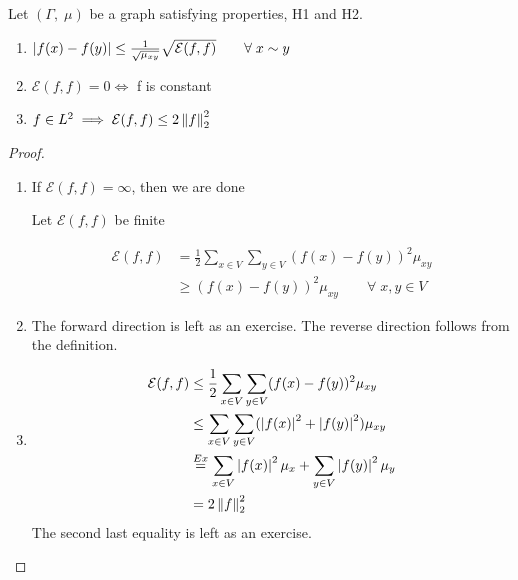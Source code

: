 \documentclass[main]{subfiles}
\begin{document}
\begin{prop}
    Let $(\Gamma,\;\mu)$ be a graph satisfying properties, H1 and H2.
    \begin{enumerate}
        \item
              $\left\lvert f(x)-f(y)\right\rvert\leq\frac{1}{\sqrt{\mu_{xy}}}\sqrt{\mathcal{E}(f,f)}\hspace{2em}\forall\;x\sim y$
        \item
              $\mathcal{E}(f, f) = 0 \iff $ f is constant
        \item
              $f \in L^2 \implies \mathcal{E}(f, f) \leq 2\left\lVert f\right\rVert_{2}^2$
    \end{enumerate}
    \begin{proof}
        \begin{enumerate}
            \item
                  If $\mathcal{E}(f,f) = \infty$, then we are done

                  Let $\mathcal{E}(f,f)$ be finite

                  \begin{align*}
                      \mathcal{E}(f,f) & = \frac{1}{2}\sum_{x \in V}\sum_{y \in V}(f(x)-f(y))^2\mu_{xy} \\
                                       & \geq (f(x)-f(y))^2\mu_{xy} \hspace{2em} \forall\;x,y \in V
                  \end{align*}
            \item The forward direction is left as an exercise. The reverse direction follows from the definition.
            \item \begin{align*}
                      \mathcal{E}(f,f) & \leq \frac{1}{2}\sum_{x \in V}\sum_{y \in V}(f(x)-f(y))^2\mu_{xy}                  \\
                                       & \leq \sum_{x \in V}\sum_{y \in V}(\left\lvert f(x)\right\rvert^2+\left\lvert f(y)\right\rvert^2)\mu_{xy}               \\
                                       & \stackrel{Ex}{=} \sum_{x \in V}\left\lvert f(x)\right\rvert^2\mu_x + \sum_{y \in V}\left\lvert f(y)\right\rvert^2\mu_y \\
                                       & = 2\left\lVert f\right\rVert_{2}^2
                  \end{align*}
                  The second last equality is left as an exercise.
        \end{enumerate}
    \end{proof}
\end{prop}
\end{document}
